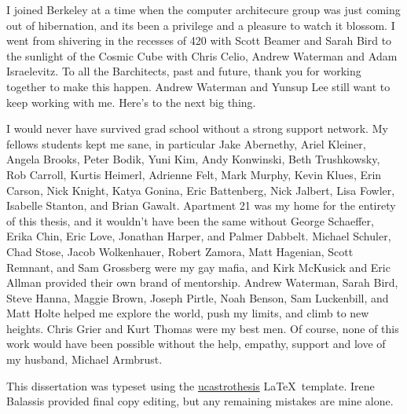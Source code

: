 \documentclass[12pt]{myucthesis}
\begin{document}
\begin{frontmatter}
\begin{acknowledgements}
I joined Berkeley at a time when the computer architecure group was just coming out of hibernation,
and its been a privilege and a pleasure to watch it blossom.
I went from shivering in the recesses of 420 with Scott Beamer and Sarah Bird
to the sunlight of the Cosmic Cube with Chris Celio, Andrew Waterman and Adam Israelevitz.
To all the Barchitects, past and future, thank you for working together to make this happen.
Andrew Waterman and Yunsup Lee still want to keep working with me.
Here's to the next big thing.

I would never have survived grad school without a strong support network.
My fellows students kept me sane, in particular
Jake Abernethy, Ariel Kleiner, Angela Brooks, Peter Bodik, Yuni Kim,
Andy Konwinski, Beth Trushkowsky, Rob Carroll, Kurtis Heimerl, Adrienne Felt, Mark Murphy,
Kevin Klues, Erin Carson, Nick Knight, Katya Gonina, Eric Battenberg, Nick Jalbert,
Lisa Fowler, Isabelle Stanton, and Brian Gawalt.
Apartment 21 was my home for the entirety of this thesis, and it wouldn't have been the same without
George Schaeffer, Erika Chin, Eric Love, Jonathan Harper, and Palmer Dabbelt.
Michael Schuler, Chad Stose, Jacob Wolkenhauer, Robert Zamora, Matt Hagenian,
Scott Remnant, and Sam Grossberg were my gay mafia, and 
Kirk McKusick and Eric Allman provided their own brand of mentorship.
Andrew Waterman, Sarah Bird, Steve Hanna, Maggie Brown, Joseph Pirtle, Noah Benson, Sam Luckenbill, and Matt Holte
helped me explore the world, push my limits, and climb to new heights.
Chris Grier and Kurt Thomas were my best men.
Of course, none of this work would have been possible without the help, empathy,  support and love
 of my husband, Michael Armbrust.


This dissertation was typeset using the
\href{https://github.com/pkgw/ucastrothesis}{\textsf{ucastrothesis}}
\LaTeX\ template.
Irene Balassis provided final copy editing, but any remaining mistakes are mine alone.

\end{acknowledgements}
\end{frontmatter}






\appendix


{}
\end{document}

